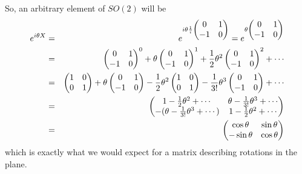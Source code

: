 \documentclass[12pt,epsf]{article}
\def\nolabel{\nonumber }
\def\nolabel{\nonumber }
\begin{document}
So, an arbitrary element of $SO(2)$ will be
\begin{eqnarray}
e^{i\theta X} &=& e^{i \theta {1\over i} 
\begin{pmatrix}
0 & 1 \\ -1 & 0
\end{pmatrix}} = e^{\theta
\begin{pmatrix}
0 & 1 \\ -1 & 0
\end{pmatrix}} \nolabel \\
&=& 
\begin{pmatrix}
0 & 1 \\ -1 & 0
\end{pmatrix}^0 + \theta
\begin{pmatrix}
0 & 1 \\ -1 & 0
\end{pmatrix}^1 + {1\over 2}\theta^2
\begin{pmatrix}
0 & 1 \\ -1 & 0
\end{pmatrix}^2 + \cdots \nolabel \\
&=& 
\begin{pmatrix}
1 & 0 \\ 0 & 1
\end{pmatrix} + \theta
\begin{pmatrix}
0 & 1 \\ -1 & 0 
\end{pmatrix} - {1\over 2}\theta^2
\begin{pmatrix}
1 & 0 \\ 0 & 1
\end{pmatrix} - {1\over 3!} \theta^3 
\begin{pmatrix}
0 & 1 \\ -1 & 0
\end{pmatrix} + \cdots \nolabel \\
&=&
\begin{pmatrix}
1 - {1\over 2}\theta^2 + \cdots & \theta - {1\over 3!}\theta^3 + \cdots
\\
-(\theta - {1\over 3!}\theta^3 + \cdots) & 1 - {1\over 2}\theta^2 +
\cdots \nolabel 
\end{pmatrix} \\
&=&
\begin{pmatrix}
\cos\theta & \sin \theta \\ -\sin \theta & \cos \theta
\end{pmatrix}\nolabel 
\end{eqnarray}
which is exactly what we would expect for a matrix describing rotations
in the plane.  
\end{document}
